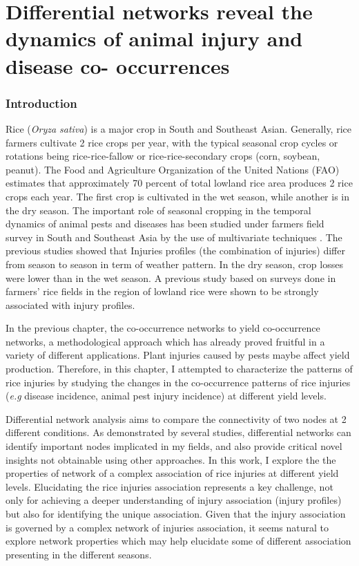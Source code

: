 \chapter{Differential networks reveal the dynamics of animal injury and disease co- occurrences}

\subsection{Introduction}
Rice (\textit{Oryza sativa}) is a major crop in South and Southeast Asian. Generally, rice farmers cultivate 2 rice crops per year, with the typical seasonal crop cycles or rotations being rice-rice-fallow or rice-rice-secondary crops (corn, soybean, peanut). The Food and Agriculture Organization of the United Nations (FAO) estimates that approximately 70 percent of total lowland rice area produces 2 rice crops each year. The first crop is cultivated in the wet season, while another is in the dry season. The important role of seasonal cropping in the temporal dynamics of animal pests and diseases has been studied under farmers field survey in South and Southeast Asia by the use of multivariate techniques \citet{Savary_2000_Characterization, Willocquet_2008_Simulating}. The previous studies showed that Injuries profiles (the combination of injuries) differ from season to season in term of weather pattern. In the dry season, crop losses were lower than in the wet season. A previous study based on surveys done in farmers’ rice fields in the region of lowland rice were shown to be strongly associated with injury profiles.

In the previous chapter, the co-occurrence networks to yield co-occurrence networks, a methodological approach which has already proved fruitful in a variety of different applications.  Plant injuries caused by pests maybe affect yield production. Therefore, in this chapter, I attempted to characterize the patterns of rice injuries by studying the changes in the co-occurrence patterns of rice injuries (\textit{e.g} disease incidence, animal pest injury incidence) at different yield levels.

Differential network analysis aims to compare the connectivity of two nodes at 2 different conditions. As demonstrated by several studies, differential networks can identify important nodes implicated in my fields, and also provide critical novel insights not obtainable using other approaches. In this work, I explore the the properties of network of a complex association of rice injuries at different yield levels. Elucidating the rice injuries association represents a key challenge, not only for achieving a deeper understanding of injury association (injury profiles) but also for identifying the unique association. Given that the injury association is governed by a complex network of injuries association, it seems natural to explore network properties which may help elucidate some of different association presenting in the different seasons.

